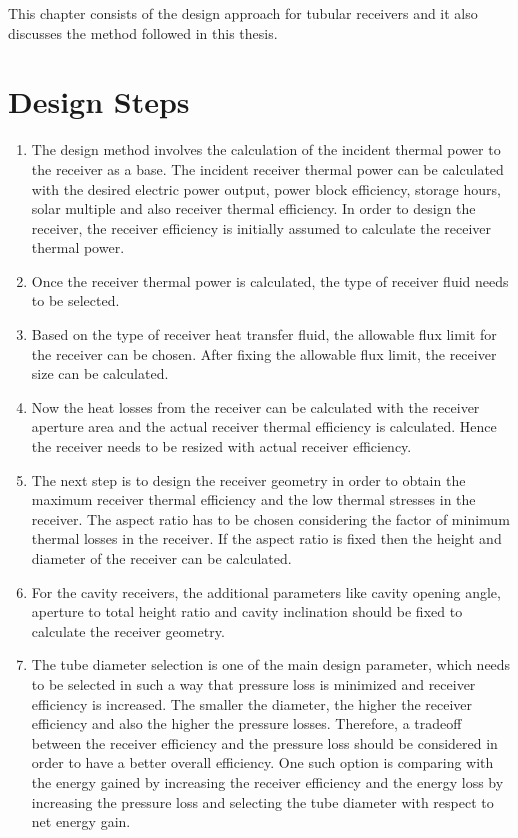 This chapter consists of the design approach for tubular receivers and it also discusses the method followed in this thesis.
\section{Design Steps}
\begin{enumerate}
	\item The design method involves the calculation of the incident thermal power to the receiver as a base. The incident receiver thermal power can be calculated with the desired electric power output, power block efficiency, storage hours, solar multiple and also receiver thermal efficiency. In order to design the receiver, the receiver efficiency is initially assumed to calculate the receiver thermal power.
	\item Once the receiver thermal power is calculated, the type of receiver fluid needs to be selected.
	\item Based on the type of receiver heat transfer fluid, the allowable flux limit for the receiver can be chosen. After fixing the allowable flux limit, the receiver size can be calculated.
	\item Now the heat losses from the receiver can be calculated with the receiver aperture area and the actual receiver thermal efficiency is calculated. Hence the receiver needs to be resized with actual receiver efficiency.
	\item The next step is to design the receiver geometry in order to obtain the maximum receiver thermal efficiency and the low thermal stresses in the receiver. The aspect ratio has to be chosen considering the factor of minimum thermal losses in the receiver. If the aspect ratio is fixed then the height and diameter of the receiver can be calculated.
	\item For the cavity receivers, the additional parameters like cavity opening angle, aperture to total height ratio and cavity inclination should be fixed to calculate the receiver geometry.
	\item The tube diameter selection is one of the main design parameter, which needs to be selected in such a way that pressure loss is minimized and receiver efficiency is increased. The smaller the diameter, the higher the receiver efficiency and also the higher the pressure losses. Therefore, a tradeoff between the receiver efficiency and the pressure loss should be considered in order to have a better overall efficiency. One such option is comparing with the energy gained by increasing the receiver efficiency and the energy loss by increasing the pressure loss and selecting the tube diameter with respect to net energy gain.

\end{enumerate}
